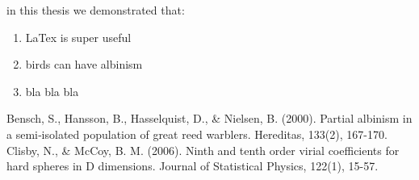 \documentclass[12pt]{article}
\begin{document}
in this thesis we demonstrated that:

\begin{enumerate}
    \item LaTex is super useful
    \item birds can have albinism
    \item bla bla bla
\end{enumerate}

\begin{thebibliography}{999}
Bensch, S., Hansson, B., Hasselquist, D., \& Nielsen, B. (2000). Partial albinism in a semi‐isolated population of great reed warblers. Hereditas, 133(2), 167-170.
Clisby, N., \& McCoy, B. M. (2006). Ninth and tenth order virial coefficients for hard spheres in D dimensions. Journal of Statistical Physics, 122(1), 15-57.
\end{thebibliography}
\end{document}
